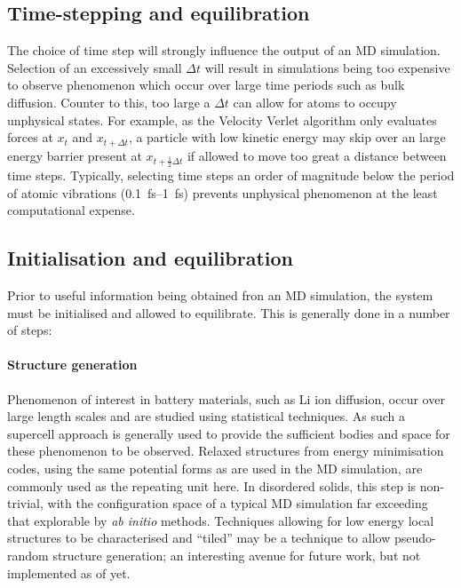 \subsection{Time-stepping and equilibration}
The choice of time step will strongly influence the output of an MD simulation. 
Selection of an excessively small $\Delta t$ will result in simulations being too expensive to observe phenomenon which occur over large time periods such as bulk diffusion.
Counter to this, too large a $\Delta t$ can allow for atoms to occupy unphysical states.
For example, as the Velocity Verlet algorithm only evaluates forces at $x_{t}$ and $x_{t +\Delta t}$,  a particle with low kinetic energy may skip over an large energy barrier present at $x_{t +\frac{1}{2}\Delta t}$ if allowed to move too great a distance between time steps.
Typically, selecting time steps an order of magnitude below the period of atomic vibrations (\SIrange{0.1}{1}{\femto\second}) prevents unphysical phenomenon at the least computational expense.

\subsection{Initialisation and equilibration}
Prior to useful information being obtained fron an MD simulation, the system must be initialised and allowed to equilibrate.
This is generally done in a number of steps:
\paragraph{Structure generation}
Phenomenon of interest in battery materials, such as Li ion diffusion, occur over large length scales and are studied using statistical techniques.
As such a supercell approach is generally used to provide the sufficient bodies and space for these phenomenon to be observed.
Relaxed structures from energy minimisation codes, using the same potential forms as are used in the MD simulation, are commonly used as the repeating unit here.
In disordered solids, this step is non-trivial, with the configuration space of a typical MD simulation far exceeding that explorable by \textit{ab initio} methods.
Techniques allowing for low energy local structures to be characterised and ``tiled'' may be a technique to allow pseudo-random structure generation; an interesting avenue for future work, but not implemented as of yet.

